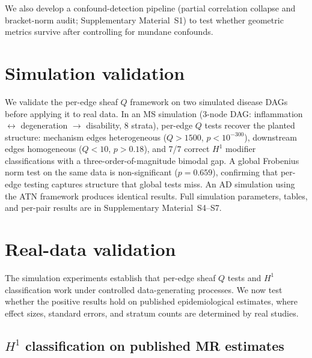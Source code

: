 \documentclass[11pt]{article}
\begin{document}
We also develop a confound-detection pipeline (partial correlation collapse and bracket-norm audit; Supplementary Material~S1) to test whether geometric metrics survive after controlling for mundane confounds.

\section{Simulation validation}
\label{sec:results}

We validate the per-edge sheaf $Q$ framework on two simulated disease DAGs before applying it to real data. In an MS simulation (3-node DAG: inflammation $\leftrightarrow$ degeneration $\to$ disability, 8 strata), per-edge $Q$ tests recover the planted structure: mechanism edges heterogeneous ($Q > 1500$, $p < 10^{-300}$), downstream edges homogeneous ($Q < 10$, $p > 0.18$), and 7/7 correct $H^1$ modifier classifications with a three-order-of-magnitude bimodal gap. A global Frobenius norm test on the same data is non-significant ($p = 0.659$), confirming that per-edge testing captures structure that global tests miss. An AD simulation using the ATN framework \citep{jack2018niaaa} produces identical results. Full simulation parameters, tables, and per-pair results are in Supplementary Material~S4--S7.

\section{Real-data validation}
\label{sec:realdata}

The simulation experiments establish that per-edge sheaf $Q$ tests and $H^1$ classification work under controlled data-generating processes. We now test whether the positive results hold on published epidemiological estimates, where effect sizes, standard errors, and stratum counts are determined by real studies.

\subsection{\texorpdfstring{$H^1$}{H1} classification on published MR estimates}
\label{sec:realdata-h1}
\end{document}
